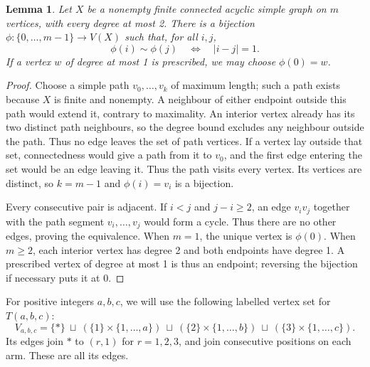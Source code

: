 \documentclass[11pt]{amsart}
\newtheorem{lemma}[theorem]{Lemma}
\theoremstyle{definition}
\begin{document}
\begin{lemma}\label{lem:path-labelling}
Let $X$ be a nonempty finite connected acyclic simple graph on $m$ vertices,
with every degree at most 2. There is a bijection
$\phi:\{0,\ldots,m-1\}\to V(X)$ such that, for all $i,j$,
\[
 \phi(i)\sim\phi(j)\quad\Longleftrightarrow\quad |i-j|=1.
\]
If a vertex $w$ of degree at most 1 is prescribed, we may choose
$\phi(0)=w$.
\end{lemma}
\begin{proof}
Choose a simple path $v_0,\ldots,v_k$ of maximum length; such a path
exists because $X$ is finite and nonempty. A neighbour of either endpoint
outside this path would extend it, contrary to maximality. An interior
vertex already has its two distinct path neighbours, so the degree bound
excludes any neighbour outside the path. Thus no edge leaves the set of
path vertices. If a vertex lay outside that set, connectedness would give
a path from it to $v_0$, and the first edge entering the set would be an
edge leaving it. Thus the path visits every vertex. Its vertices are
distinct, so $k=m-1$ and $\phi(i)=v_i$ is a bijection.

Every consecutive pair is adjacent. If $i<j$ and $j-i\geq2$, an edge
$v_iv_j$ together with the path segment $v_i,\ldots,v_j$ would form a
cycle. Thus there are no other edges, proving the equivalence.
When $m=1$, the unique vertex is $\phi(0)$. When $m\geq2$, each
interior vertex has degree 2 and both endpoints have degree 1. A
prescribed vertex of degree at most 1 is thus an endpoint;
reversing the bijection if necessary puts it at 0.
\end{proof}

For positive integers $a,b,c$, we will use the following labelled vertex
set for $T(a,b,c)$:
\[
 V_{a,b,c}=\{*\}\ \sqcup\
  (\{1\}\times\{1,\ldots,a\})\ \sqcup\
  (\{2\}\times\{1,\ldots,b\})\ \sqcup\
  (\{3\}\times\{1,\ldots,c\}).
\]
Its edges join $*$ to $(r,1)$ for $r=1,2,3$, and join consecutive
positions on each arm. These are all its edges.
\end{document}
